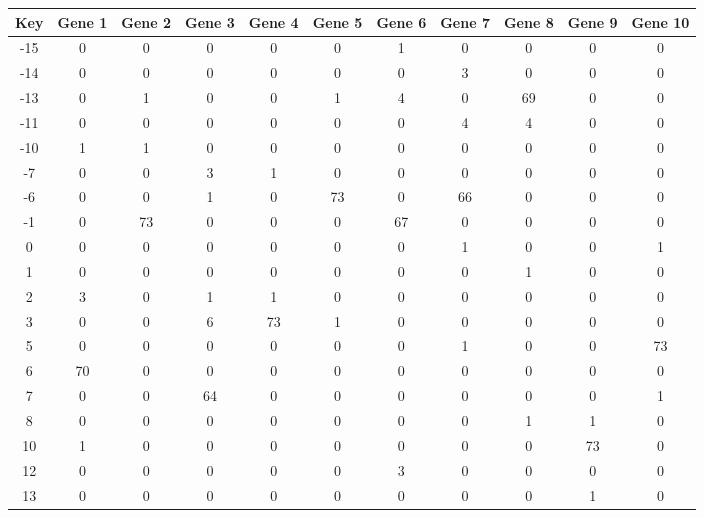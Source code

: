 \begin{tabular}{|c|c|c|c|c|c|c|c|c|c|c|}
\hline
Key & Gene 1 & Gene 2 & Gene 3 & Gene 4 & Gene 5 & Gene 6 & Gene 7 & Gene 8 & Gene 9 & Gene 10 \\
\hline
-15 & 0 & 0 & 0 & 0 & 0 & 1 & 0 & 0 & 0 & 0 \\
-14 & 0 & 0 & 0 & 0 & 0 & 0 & 3 & 0 & 0 & 0 \\
-13 & 0 & 1 & 0 & 0 & 1 & 4 & 0 & 69 & 0 & 0 \\
-11 & 0 & 0 & 0 & 0 & 0 & 0 & 4 & 4 & 0 & 0 \\
-10 & 1 & 1 & 0 & 0 & 0 & 0 & 0 & 0 & 0 & 0 \\
-7 & 0 & 0 & 3 & 1 & 0 & 0 & 0 & 0 & 0 & 0 \\
-6 & 0 & 0 & 1 & 0 & 73 & 0 & 66 & 0 & 0 & 0 \\
-1 & 0 & 73 & 0 & 0 & 0 & 67 & 0 & 0 & 0 & 0 \\
0 & 0 & 0 & 0 & 0 & 0 & 0 & 1 & 0 & 0 & 1 \\
1 & 0 & 0 & 0 & 0 & 0 & 0 & 0 & 1 & 0 & 0 \\
2 & 3 & 0 & 1 & 1 & 0 & 0 & 0 & 0 & 0 & 0 \\
3 & 0 & 0 & 6 & 73 & 1 & 0 & 0 & 0 & 0 & 0 \\
5 & 0 & 0 & 0 & 0 & 0 & 0 & 1 & 0 & 0 & 73 \\
6 & 70 & 0 & 0 & 0 & 0 & 0 & 0 & 0 & 0 & 0 \\
7 & 0 & 0 & 64 & 0 & 0 & 0 & 0 & 0 & 0 & 1 \\
8 & 0 & 0 & 0 & 0 & 0 & 0 & 0 & 1 & 1 & 0 \\
10 & 1 & 0 & 0 & 0 & 0 & 0 & 0 & 0 & 73 & 0 \\
12 & 0 & 0 & 0 & 0 & 0 & 3 & 0 & 0 & 0 & 0 \\
13 & 0 & 0 & 0 & 0 & 0 & 0 & 0 & 0 & 1 & 0 \\
\hline
\end{tabular}